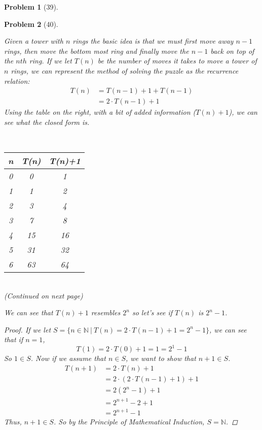 \documentclass{article}
\theoremstyle{problem}
\newtheorem{prob}{Problem}
\theoremstyle{plain}
\theoremstyle{remark}
\begin{document}
\begin{prob}[39]
\begin{enumerate}[a)]
  \end{enumerate}
\end{prob}

\begin{prob}[40]
  \begin{multicols}{2}
    Given a tower with $n$ rings the basic idea is that we must first move away $n-1$ rings, then move the bottom most ring and finally move the $n-1$ back on top of the $nth$ ring. If we let $T(n)$ be the number of moves it takes to move a tower of $n$ rings, we can represent the method of solving the puzzle as the recurrence relation:
\begin{align*}
T(n) &= T(n-1) + 1 + T(n - 1)\\
     &= 2\cdot T(n - 1) + 1
\end{align*}
Using the table on the right, with a bit of added information ($T(n)+1$), we can see what the closed form is.
    \vfill
    \columnbreak
    \begin{center}\ \\[1cm]
      \begin{tabular}{c|c c}
        n & T(n) & T(n)+1\\
        \hline
        0 & 0 & 1\\
        1 & 1 & 2\\
        2 & 3 & 4\\
        3 & 7 & 8\\
        4 & 15& 16\\
        5 & 31& 32\\
        6 & 63& 64
      \end{tabular}\\[.5cm]
  (Continued on next page)
  \end{center}

\end{multicols}
  We can see that $T(n) + 1$ resembles $2^n$ so let's see if $T(n)$ is $2^n - 1$. 
\begin{proof}
If we let $S = \{n \in \mathbb{N}\ |\ T(n) = 2\cdot T(n-1) + 1 = 2^n -1\}$, we can see that if $n = 1$,
$$
  T(1) = 2\cdot T(0) +1 = 1 = 2^1 - 1
$$
So $1 \in S$. Now if we assume that $n \in S$, we want to show that $n + 1 \in S$.
\begin{align*}
  T(n+1) &= 2\cdot T(n) + 1\\
         &= 2\cdot (2\cdot T(n-1) + 1) + 1\\
         &= 2 (2^n - 1) + 1\\
         &= 2^{n+1} - 2 + 1\\
         &= 2^{n+1} - 1
\end{align*}
Thus, $n + 1 \in S$. So by the Principle of Mathematical Induction, $S = \mathbb{N}$.
\end{proof}
\end{prob}
\end{document}
